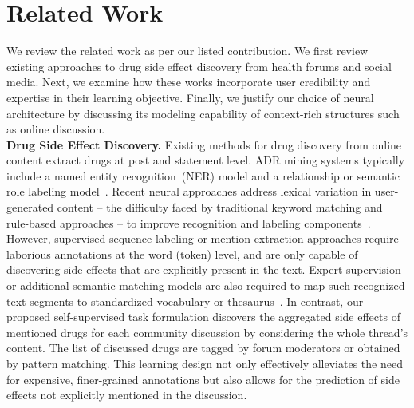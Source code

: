 \documentclass{bmcart}
\begin{document}
\section{Related Work}\label{sec:related_work}

We review the related work as per our listed contribution. We first review existing approaches to drug side effect discovery from health forums and social media. Next, we examine how these works incorporate user credibility and expertise in their learning objective. Finally, we justify our choice of neural architecture by discussing its modeling capability of context-rich structures such as online discussion. \\

{\bf Drug Side Effect Discovery.} Existing methods for drug discovery from online content extract drugs at post and statement level. ADR mining systems typically include 
a named entity recognition~(NER) model and a relationship or semantic role labeling model~\cite{sampathkumar2014mining,liu2018patient}. 
Recent neural approaches address lexical variation in user-generated content -- the difficulty faced by traditional keyword matching and rule-based approaches -- to improve recognition and labeling components~\cite{ding2018attentive,wunnava2019adverse}. However, supervised sequence labeling or mention extraction approaches require laborious annotations at the word (token) level, and are only capable of discovering side effects that are explicitly present in the text. Expert supervision or additional semantic matching models are also required to map such recognized text segments to standardized vocabulary or thesaurus~\cite{yates2015extracting}. In contrast, our proposed self-supervised task formulation discovers the aggregated side effects of mentioned drugs for each community discussion by considering the whole thread's content. The list of discussed drugs are tagged by forum moderators or obtained by pattern matching. This learning design not only effectively alleviates the need for expensive, finer-grained annotations but also allows for the prediction of side effects not explicitly mentioned in the discussion. \\
\end{document}
